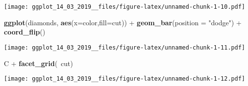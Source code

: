 \documentclass[]{article}
\newenvironment{Shaded}{\begin{snugshade}}{\end{snugshade}}
\newcommand{\KeywordTok}[1]{\textcolor[rgb]{0.13,0.29,0.53}{\textbf{{#1}}}}
\newcommand{\DataTypeTok}[1]{\textcolor[rgb]{0.13,0.29,0.53}{{#1}}}
\newcommand{\StringTok}[1]{\textcolor[rgb]{0.31,0.60,0.02}{{#1}}}
\newcommand{\NormalTok}[1]{{#1}}
\begin{document}
\texttt{[image: ggplot\_14\_03\_2019\_\_files/figure-latex/unnamed-chunk-1-10.pdf]}

\begin{Shaded}
\begin{Highlighting}[]
\KeywordTok{ggplot}\NormalTok{(diamonds, }\KeywordTok{aes}\NormalTok{(}\DataTypeTok{x=}\NormalTok{color,}\DataTypeTok{fill=}\NormalTok{cut)) +}\StringTok{ }
\StringTok{  }\KeywordTok{geom_bar}\NormalTok{(}\DataTypeTok{position =} \StringTok{"dodge"}\NormalTok{) +}\StringTok{ }\KeywordTok{coord_flip}\NormalTok{()}
\end{Highlighting}
\end{Shaded}

\texttt{[image: ggplot\_14\_03\_2019\_\_files/figure-latex/unnamed-chunk-1-11.pdf]}

\begin{Shaded}
\begin{Highlighting}[]
\NormalTok{C +}\StringTok{ }\KeywordTok{facet_grid}\NormalTok{(~cut)}
\end{Highlighting}
\end{Shaded}

\texttt{[image: ggplot\_14\_03\_2019\_\_files/figure-latex/unnamed-chunk-1-12.pdf]}
\end{document}
